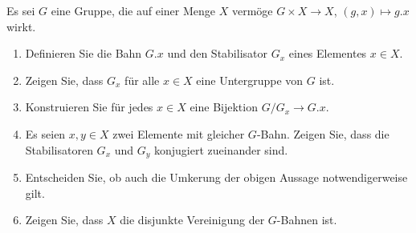 \begin{question}
  Es sei $G$ eine Gruppe, die auf einer Menge $X$ vermöge $G \times X \to X$, $(g,x) \mapsto g.x$ wirkt.
  \begin{enumerate}
    \item
      Definieren Sie die Bahn $G.x$ und den Stabilisator $G_x$ eines Elementes $x \in X$.
    \item
      Zeigen Sie, dass $G_x$ für alle $x \in X$ eine Untergruppe von $G$ ist.
    \item
      Konstruieren Sie für jedes $x \in X$ eine Bijektion $G/G_x \to G.x$.
    \item
      Es seien $x, y \in X$ zwei Elemente mit gleicher $G$-Bahn.
      Zeigen Sie, dass die Stabilisatoren $G_x$ und $G_y$ konjugiert zueinander sind.
    \item
      Entscheiden Sie, ob auch die Umkerung der obigen Aussage notwendigerweise gilt.
    \item
      Zeigen Sie, dass $X$ die disjunkte Vereinigung der $G$-Bahnen ist.
  \end{enumerate}
\end{question}


